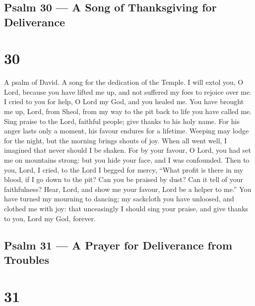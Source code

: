 \hypertarget{psalm-30-a-song-of-thanksgiving-for-deliverance}{%
\subsection{Psalm 30 --- A Song of Thanksgiving for
Deliverance}\label{psalm-30-a-song-of-thanksgiving-for-deliverance}}

\hypertarget{section-29}{%
\section{30}\label{section-29}}

A psalm of David. A song for the dedication of the Temple. 
I will extol you, O Lord, because you have lifted me up, and not
suffered my foes to rejoice over me.  I cried to you for
help, O Lord my God, and you healed me.  You have brought me
up, Lord, from Sheol, from my way to the pit back to life you have
called me.  Sing praise to the Lord, faithful people; give
thanks to his holy name.  For his anger lasts only a moment,
his favour endures for a lifetime. Weeping may lodge for the night, but
the morning brings shouts of joy.  When all went well, I
imagined that never should I be shaken.  For by your favour,
O Lord, you had set me on mountains strong: but you hide your face, and
I was confounded.  Then to you, Lord, I cried, to the Lord I
begged for mercy,  ``What profit is there in my blood, if I
go down to the pit? Can you be praised by dust? Can it tell of your
faithfulness?  Hear, Lord, and show me your favour, Lord be
a helper to me.''  You have turned my mourning to dancing;
my sackcloth you have unloosed, and clothed me with joy: 
that unceasingly I should sing your praise, and give thanks to you, Lord
my God, forever.

\hypertarget{psalm-31-a-prayer-for-deliverance-from-troubles}{%
\subsection{Psalm 31 --- A Prayer for Deliverance from
Troubles}\label{psalm-31-a-prayer-for-deliverance-from-troubles}}

\hypertarget{section-30}{%
\section{31}\label{section-30}}


